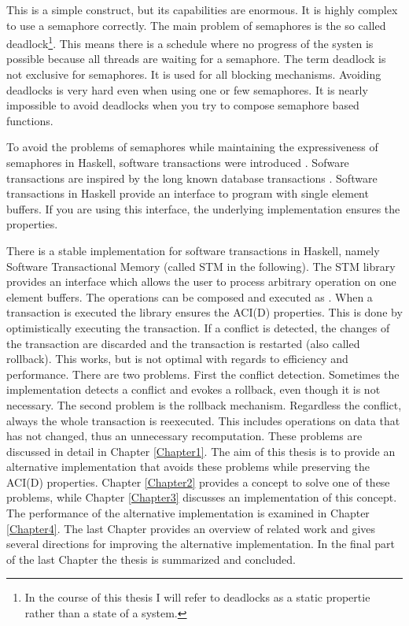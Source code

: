 This is a simple construct, but its capabilities are enormous. It is highly complex to use a semaphore correctly.
The main problem of semaphores is the so called deadlock\footnote{In the course of this thesis I will refer to deadlocks as a static propertie rather than a state of a system.}. 
This means there is a schedule where no progress of the systen is possible because all threads are waiting for a semaphore. The term deadlock is not exclusive for semaphores.
It is used for all blocking mechanisms. Avoiding deadlocks is very hard even when using one or few semaphores. 
It is nearly impossible to avoid deadlocks when you try to compose semaphore based functions.

To avoid the problems of semaphores while maintaining the expressiveness of semaphores in Haskell, software transactions were introduced \parencite{STMBase}.
Sofware transactions are inspired by the long known database transactions \parencite{DBTrans}. Software transactions in Haskell provide an interface to program with 
single element buffers. If you are using this interface, the underlying implementation ensures the  properties.  

There is a stable implementation for software transactions in Haskell, namely Software Transactional Memory (called STM in the following). The STM library provides 
an interface which allows the user to process arbitrary operation on one element buffers. The operations can be composed and executed as .
When a transaction is executed the library ensures the ACI(D) properties. This is done by optimistically executing the transaction.  
If a conflict is detected, the changes of the transaction are discarded and the transaction is restarted (also called rollback). 
This works, but is not optimal with regards to efficiency and performance. There are two problems. First the conflict detection. Sometimes the implementation detects 
a conflict and evokes a rollback, even though it is not necessary. The second problem is the rollback mechanism. Regardless the conflict, always the whole transaction
is reexecuted. This includes operations on data that has not changed, thus an unnecessary recomputation. These problems are discussed in detail in Chapter \ref{Chapter1}. 
The aim of this thesis is to provide an alternative implementation that avoids these problems while preserving the ACI(D) properties. Chapter \ref{Chapter2} provides 
a concept to solve one of these problems, while Chapter \ref{Chapter3} discusses an implementation of this concept. The performance of the alternative implementation is 
examined in Chapter \ref{Chapter4}. The last Chapter provides an overview of related work and gives several directions for improving the alternative implementation. 
In the final part of the last Chapter the thesis is summarized and concluded.
